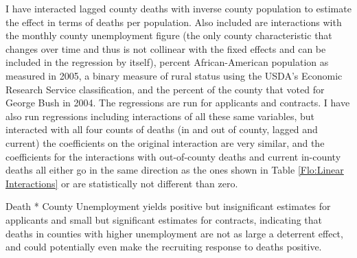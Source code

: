 \documentclass[12pt] {article}
\begin{document}
I have interacted lagged county deaths with inverse county population to estimate the effect in terms of deaths per population. Also included are interactions with the monthly county unemployment figure (the only county characteristic
that changes over time and thus is not collinear with the fixed effects
and can be included in the regression by itself), percent African-American
population as measured in 2005, %
a binary measure of rural status using the USDA's Economic Research Service classification, and the percent of the county that voted for George Bush in 2004.
The regressions are run for applicants and contracts.%
I have also run regressions including interactions of all these same
variables, but interacted with all four counts of deaths (in and out
of county, lagged and current) the coefficients on the original interaction
are very similar, and the coefficients for the interactions with out-of-county
deaths and current in-county deaths all either go in the same direction
as the ones shown in Table \ref{Flo:Linear Interactions} or are
statistically not different than zero. 



Death {*} County Unemployment yields positive but insignificant estimates
for applicants and small but significant estimates for contracts,
indicating that deaths in counties with higher unemployment are not
as large a deterrent effect, and could potentially even make the recruiting response
to deaths positive. %
\end{document}
